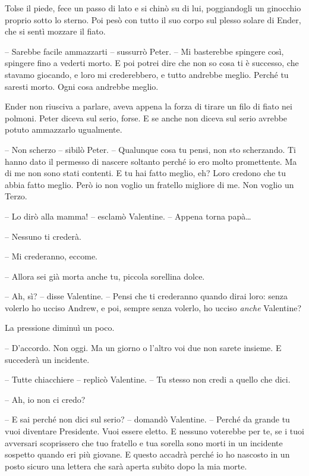 {Tolse il piede, fece un passo di lato e si chinò su di lui,
	poggiandogli un ginocchio proprio sotto lo sterno. Poi pesò con tutto il
	suo corpo sul plesso solare di Ender, che si sentì mozzare il fiato.}

{-- Sarebbe facile ammazzarti -- sussurrò Peter. -- Mi basterebbe
	spingere così, spingere fino a vederti morto. E poi potrei dire che non
	so cosa ti è successo, che stavamo giocando, e loro mi crederebbero, e
	tutto andrebbe meglio. Perché tu saresti morto. Ogni cosa andrebbe
	meglio.}

{Ender non riusciva a parlare, aveva appena la forza di tirare un filo
	di fiato nei polmoni. Peter diceva sul serio, forse. E se anche non
	diceva sul serio avrebbe potuto ammazzarlo ugualmente.}

{-- Non scherzo -- sibilò Peter. -- Qualunque cosa tu pensi, non sto
	scherzando. Ti hanno dato il permesso di nascere soltanto perché io ero
	molto promettente. Ma di me non sono stati contenti. E tu hai fatto
	meglio, eh? Loro credono che tu abbia fatto meglio. Però io non voglio
	un fratello migliore di me. Non voglio un Terzo.}

{-- Lo dirò alla mamma! -- esclamò Valentine. -- Appena torna
	papà\ldots{}}

{-- Nessuno ti crederà.}

{-- Mi crederanno, eccome.}

{-- Allora sei già morta anche tu, piccola sorellina dolce.}

{-- Ah, sì? -- disse Valentine. -- Pensi che ti crederanno quando dirai
	loro: senza volerlo ho ucciso Andrew, e poi, sempre senza volerlo, ho
	ucciso \emph{anche} Valentine?}

{La pressione diminuì un poco.}

{-- D'accordo. Non oggi. Ma un giorno o l'altro voi due non sarete
	insieme. E succederà un incidente.}

{-- Tutte chiacchiere -- replicò Valentine. -- Tu stesso non credi a
	quello che dici.}

{-- Ah, io non ci credo?}

{-- E sai perché non dici sul serio? -- domandò Valentine. -- Perché da
	grande tu vuoi diventare Presidente. Vuoi essere eletto. E nessuno
	voterebbe per te, se i tuoi avversari scoprissero che tuo fratello e tua
	sorella sono morti in un incidente sospetto quando eri più giovane. E
	questo accadrà perché io ho nascosto in un posto sicuro una lettera che
	sarà aperta subito dopo la mia morte.}


